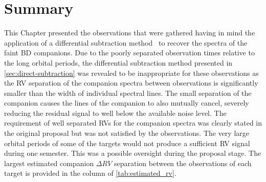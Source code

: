 \section{Summary}
This Chapter presented the observations that were gathered having in mind the application of a differential subtraction method~\citep[e.g.][]{ferluga_separating_1997, kostogryz_spectral_2013} to recover the spectra of the faint {BD} companions.
Due to the poorly separated observation times relative to the long orbital periods, the differential subtraction method presented in \cref{sec:direct-subtraction} was revealed to be inappropriate for these observations as the {RV} separation of the companion spectra between observations is significantly smaller than the width of individual spectral lines.
The small separation of the companion causes the lines of the companion to also mutually cancel, severely reducing the residual signal to well below the available noise level.
The requirement of well separated {RV}s for the companion spectra was clearly stated in the original proposal but was not satisfied by the observations.
{\red{} The very large orbital periods of some of the targets would not produce a sufficient {RV} signal during one semester.
This was a possible oversight during the proposal stage.} The largest estimated companion \(\Delta {RV}\) separation between the observations of each target is provided in the  column of \cref{tab:estimated_rv}.
